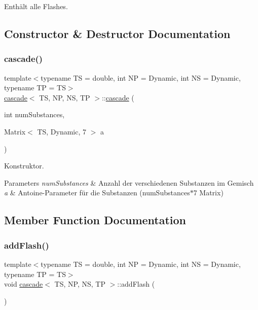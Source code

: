 Enthält alle Flashes. 

\subsection{Constructor \& Destructor Documentation}
\mbox{\label{classcascade_a9775f4c242df052cfb9c0c8a095a2964}} 
\subsubsection{\texorpdfstring{cascade()}{cascade()}}
{\footnotesize\ttfamily template$<$typename TS = double, int NP = Dynamic, int NS = Dynamic, typename TP = TS$>$ \\
\mbox{\hyperlink{classcascade}{cascade}}$<$ TS, NP, NS, TP $>$\+::\mbox{\hyperlink{classcascade}{cascade}} (\begin{DoxyParamCaption}\item[{int}]{num\+Substances,  }\item[{Matrix$<$ TS, Dynamic, 7 $>$}]{a }\end{DoxyParamCaption})\hspace{0.3cm}{\ttfamily [inline]}}



Konstruktor. 


\begin{DoxyParams}{Parameters}
{\em num\+Substances} & Anzahl der verschiedenen Substanzen im Gemisch \\
\hline
{\em a} & Antoine-\/\+Parameter für die Substanzen (num\+Substances$\ast$7 Matrix) \\
\hline
\end{DoxyParams}


\subsection{Member Function Documentation}
\mbox{\label{classcascade_ae1aae44e18b9d87cb710c54726726baa}} 
\subsubsection{\texorpdfstring{add\+Flash()}{addFlash()}}
{\footnotesize\ttfamily template$<$typename TS = double, int NP = Dynamic, int NS = Dynamic, typename TP = TS$>$ \\
void \mbox{\hyperlink{classcascade}{cascade}}$<$ TS, NP, NS, TP $>$\+::add\+Flash (\begin{DoxyParamCaption}{ }\end{DoxyParamCaption})\hspace{0.3cm}{\ttfamily [inline]}}



